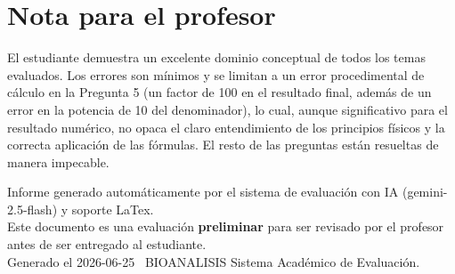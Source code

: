 \documentclass[11pt,a4paper]{article}
\begin{document}
\section*{Nota para el profesor}
\begin{tcolorbox}[
  enhanced, breakable,
  colback=yellow!8, colframe=yellow!60!black,
  fonttitle=\bfseries, coltitle=black,
  title={Observaciones para revisión manual},
  top=4pt, bottom=4pt, left=8pt, right=8pt,
]
El estudiante demuestra un excelente dominio conceptual de todos los temas evaluados. Los errores son mínimos y se limitan a un error procedimental de cálculo en la Pregunta 5 (un factor de 100 en el resultado final, además de un error en la potencia de 10 del denominador), lo cual, aunque significativo para el resultado numérico, no opaca el claro entendimiento de los principios físicos y la correcta aplicación de las fórmulas. El resto de las preguntas están resueltas de manera impecable.
\end{tcolorbox}

\vspace{12pt}
\begin{center}
  \footnotesize\color{gray}
  Informe generado automáticamente por el sistema de evaluación con IA (gemini-2.5-flash) y soporte LaTex. \\
  Este documento es una evaluación \textbf{preliminar} para ser revisado por el profesor antes de ser entregado al 
  estudiante. \\
  Generado el 2026-06-25 \textbullet\ BIOANALISIS Sistema Académico de Evaluación.
  \end{center}
\end{document}
